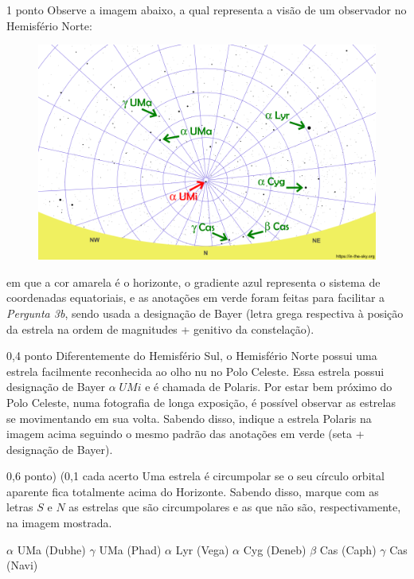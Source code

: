 \documentclass{../lista}
\begin{document}
	\begin{questao}{1 ponto}
		Observe a imagem abaixo, a qual representa a visão de um observador no Hemisfério Norte:
		\begin{figure}[H]
			\centering
			\includegraphics[scale=0.5]{./img/3.png}
		\end{figure}
		em que a cor amarela é o horizonte, o gradiente azul representa o sistema de coordenadas equatoriais, e as anotações em verde foram feitas para facilitar a \textit{Pergunta 3b}, sendo usada a designação de Bayer (letra grega respectiva à posição da estrela na ordem de magnitudes + genitivo da constelação).

		\begin{pergunta}{0,4 ponto}
			Diferentemente do Hemisfério Sul, o Hemisfério Norte possui uma estrela facilmente reconhecida ao olho nu no Polo Celeste. Essa estrela possui designação de Bayer $\alpha \; UMi$ e é chamada de Polaris. Por estar bem próximo do Polo Celeste, numa fotografia de longa exposição, é possível observar as estrelas se movimentando em sua volta. Sabendo disso, indique a estrela Polaris na imagem acima seguindo o mesmo padrão das anotações em verde (seta + designação de Bayer).
		\end{pergunta}

		\begin{pergunta}{0,6 ponto) (0,1 cada acerto}
			Uma estrela é circumpolar se o seu círculo orbital aparente fica totalmente acima do Horizonte. Sabendo disso, marque com as letras $S$ e $N$ as estrelas que são circumpolares e as que não são, respectivamente, na imagem mostrada.
			\begin{multicols}{3} \begin{alternativas}
				\alternativaMarcada[$\red{S}$] $\alpha$ UMa (Dubhe)
				\alternativaMarcada[$\red{N}$] $\gamma$ UMa (Phad)
				\alternativaMarcada[$\red{N}$] $\alpha$ Lyr (Vega)
				\alternativaMarcada[$\red{N}$] $\alpha$ Cyg (Deneb)
				\alternativaMarcada[$\red{N}$] $\beta$ Cas (Caph)
				\alternativaMarcada[$\red{S}$] $\gamma$ Cas (Navi)
			\end{alternativas} \end{multicols}
		\end{pergunta}
	\end{questao}
\end{document}
